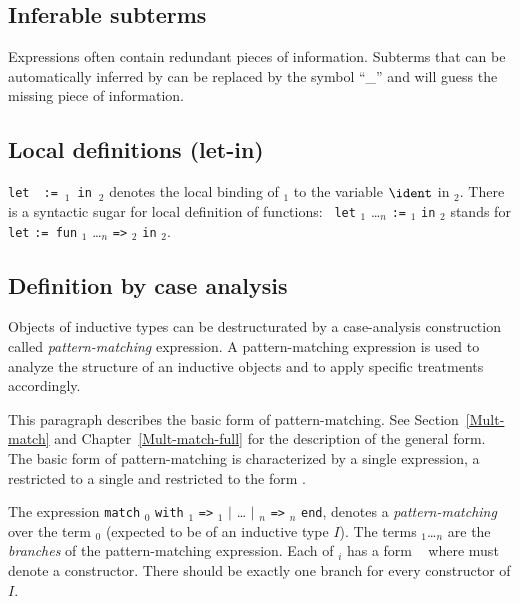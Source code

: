 \subsection{Inferable subterms
\label{hole}
\index{\_}}

Expressions often contain redundant pieces of information. Subterms that
can be automatically inferred by {\Coq} can be replaced by the
symbol ``\_'' and {\Coq} will guess the missing piece of information.

\subsection{Local definitions (let-in)
\label{let-in}
}


{\tt let}~{\ident}~{\tt :=}~{\term$_1$}~{\tt in}~{\term$_2$} denotes
the local binding of \term$_1$ to the variable $\ident$ in
\term$_2$. 
There is a syntactic sugar for local definition of functions: {\tt
let} {\ident} {\binder$_1$} \ldots {\binder$_n$} {\tt :=} {\term$_1$}
{\tt in} {\term$_2$} stands for {\tt let} {\ident} {\tt := fun}
{\binder$_1$} \ldots {\binder$_n$} {\tt =>} {\term$_2$} {\tt in}
{\term$_2$}.

\subsection{Definition by case analysis
\label{caseanalysis}
}

Objects of inductive types can be destructurated by a case-analysis
construction called {\em pattern-matching} expression.  A
pattern-matching expression is used to analyze the structure of an
inductive objects and to apply specific treatments accordingly.

This paragraph describes the basic form of pattern-matching. See
Section~\ref{Mult-match} and Chapter~\ref{Mult-match-full} for the
description of the general form. The basic form of pattern-matching is
characterized by a single {\caseitem} expression, a {\multpattern}
restricted to a single {\pattern} and {\pattern} restricted to the
form {\qualid} \nelist{\ident}{}.

The expression {\tt match} {\term$_0$} {\returntype} {\tt with}
{\pattern$_1$} {\tt =>} {\term$_1$} {\tt $|$} {\ldots} {\tt $|$}
{\pattern$_n$} {\tt =>} {\term$_n$} {\tt end}, denotes a {\em
pattern-matching} over the term {\term$_0$} (expected to be of an
inductive type $I$).  The terms {\term$_1$}\ldots{\term$_n$} are the
{\em branches} of the pattern-matching expression. Each of
{\pattern$_i$} has a form \qualid~\nelist{\ident}{} where {\qualid}
must denote a constructor. There should be exactly one branch for
every constructor of $I$.

